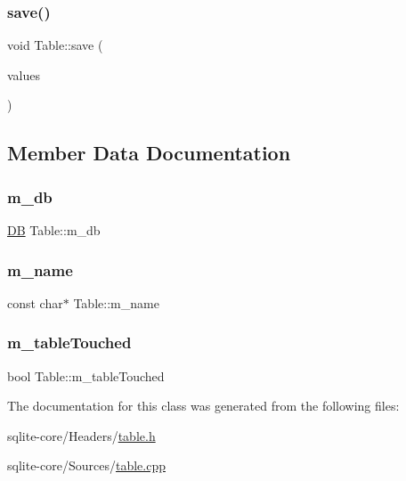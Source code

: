 \mbox{\label{classTable_a4b2f3b62906af3f7548fc1ebd648dfc5}} 
\subsubsection{\texorpdfstring{save()}{save()}}
{\footnotesize\ttfamily void Table\+::save (\begin{DoxyParamCaption}\item[{const vector$<$ \mbox{\hyperlink{structSqlValue}{Sql\+Value}} $>$ \&}]{values }\end{DoxyParamCaption})}



\subsection{Member Data Documentation}
\mbox{\label{classTable_ab6a536f7b7619cd252c6f7b67909a505}} 
\subsubsection{\texorpdfstring{m\+\_\+db}{m\_db}}
{\footnotesize\ttfamily \mbox{\hyperlink{classDB}{DB}} Table\+::m\+\_\+db\hspace{0.3cm}{\ttfamily [private]}}

\mbox{\label{classTable_aaa150472b3686c7d86a5af58e7970f4a}} 
\subsubsection{\texorpdfstring{m\+\_\+name}{m\_name}}
{\footnotesize\ttfamily const char$\ast$ Table\+::m\+\_\+name\hspace{0.3cm}{\ttfamily [private]}}

\mbox{\label{classTable_a76e6e836dd4e86fa85064ed8a5f0d425}} 
\subsubsection{\texorpdfstring{m\+\_\+table\+Touched}{m\_tableTouched}}
{\footnotesize\ttfamily bool Table\+::m\+\_\+table\+Touched\hspace{0.3cm}{\ttfamily [private]}}



The documentation for this class was generated from the following files\+:\begin{DoxyCompactItemize}
\item 
sqlite-\/core/\+Headers/\mbox{\hyperlink{table_8h}{table.\+h}}\item 
sqlite-\/core/\+Sources/\mbox{\hyperlink{table_8cpp}{table.\+cpp}}\end{DoxyCompactItemize}
